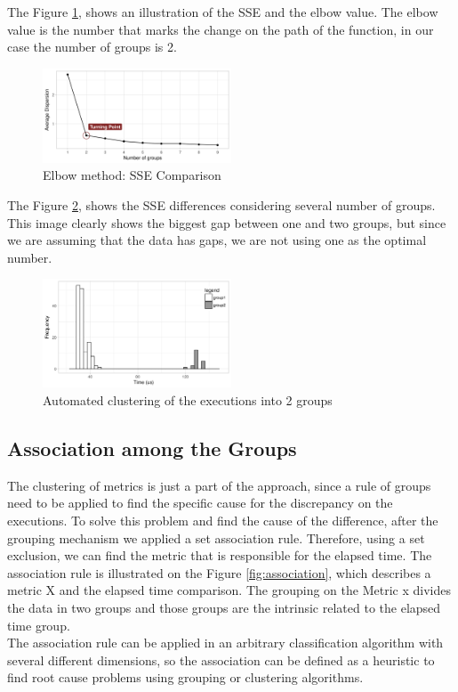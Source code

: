     The Figure \ref{fig:sse}, shows an illustration of the SSE and the elbow value. The elbow value is the number that marks the change on the path of the function, in our case the number of groups is 2. 
     \begin{figure}[h]
     \vspace{-10pt}
      \centering
        \includegraphics[width=0.50\textwidth]{figures/sse-groups.png}
        \caption{Elbow method: SSE Comparison}
        \label{fig:sse}
        \vspace{-10pt}
    \end{figure}
    
    The Figure \ref{fig:grouping-hist}, shows the SSE differences considering several number of groups. This image clearly shows the biggest gap between one and two groups, but since we are assuming that the data has gaps, we are not using one as the optimal number.
    
    \begin{figure}[h]
      \centering
        \includegraphics[width=0.50\textwidth]{figures/grouping-hist.png}
        \caption{Automated clustering of the executions into 2 groups}
        \label{fig:grouping-hist}
        \vspace{-10pt}
    \end{figure}

    
\subsection{Association among the Groups}
\label{sec:association}
The clustering of metrics is just a part of the approach, since a rule of groups need to be applied to find the specific cause for the discrepancy on the executions. To solve this problem and find the cause of the difference, after the grouping mechanism we applied a set association rule. Therefore, using a set exclusion, we can find the metric that is responsible for the elapsed time.
The association rule is illustrated on the Figure \ref{fig:association}, which describes a metric X and the elapsed time comparison. The grouping on the Metric x divides the data in two groups and those groups are the intrinsic related to the elapsed time group. \\
The association rule can be applied in an arbitrary classification algorithm with several different dimensions, so the association can be defined as a heuristic to find root cause problems using grouping or clustering algorithms.

